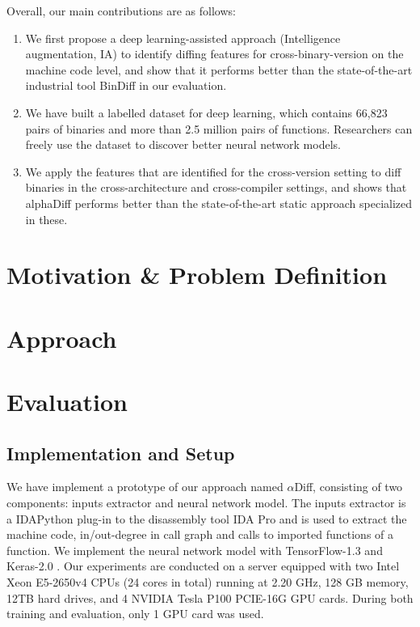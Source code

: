 \documentclass[10pt,conference]{IEEEtran}
\begin{document}
Overall, our main contributions are as follows:
\begin{enumerate}
\item We first propose a deep learning-assisted approach (Intelligence augmentation, IA) to identify diffing features for cross-binary-version on the machine code level, 
and show that it performs better than the state-of-the-art industrial tool BinDiff in our evaluation.

\item We have built a labelled dataset for deep learning, which contains 66,823 pairs of binaries and more than 2.5 million pairs of functions. 
Researchers can freely use the dataset to discover better neural network models.

\item We apply the features that are identified for the cross-version setting to diff binaries in the cross-architecture and cross-compiler settings, 
and shows that alphaDiff performs better than the state-of-the-art static approach specialized in these.
\end{enumerate}

\section{Motivation \& Problem Definition}

\section{Approach}


\section{Evaluation}

\subsection{Implementation and Setup}
We have implement a prototype of our approach named $\alpha$Diff, consisting of two
 components: inputs extractor and neural network model. 
The inputs extractor is a IDAPython \cite{idapython} plug-in to the disassembly tool
 IDA Pro \cite{idapro} and is used to extract the machine code, in/out-degree in call
  graph and calls to imported functions of a function. 
We implement the neural network model with TensorFlow-1.3 \cite{abadi2016tensorflow}
 and Keras-2.0 \cite{chollet2015keras}. 
Our experiments are conducted on a server equipped with two Intel Xeon E5-2650v4
 CPUs (24 cores in total) running at 2.20 GHz, 128 GB memory, 12TB hard drives,
  and 4 NVIDIA Tesla P100 PCIE-16G GPU cards. 
During both training and evaluation, only 1 GPU card was used.
\end{document}
